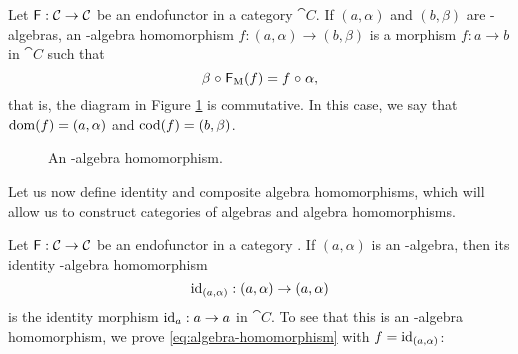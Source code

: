 \begin{definition}
  \label{def:algebra-homomorphism}


  Let $\mathsf{F}: \mathcal{C} \to \mathcal{C}$ be an endofunctor in a category
  $\cat{C}$. If $(a,\alpha)$ and $(b,\beta)$ are -algebras, an
  -algebra homomorphism $f: (a,\alpha) \to (b,\beta)$ is a
  morphism $f: a \to b$ in $\cat{C}$ such that
  \begin{equation}
    \label{eq:algebra-homomorphism}
    \beta \mathrel{\circ} \mathsf{F}_{\operatorname{M}}(f) = f \mathrel{\circ} \alpha
    \text{,}
  \end{equation}
  that is, the diagram in Figure \ref{fig:algebra-homomorphism} is
  commutative. In this case, we say that $\operatorname{dom}(f) = (a,\alpha)$ and
  $\operatorname{cod}(f) = (b,\beta)$.

  \begin{figure}[htb]
    \begin{center}
    \end{center}
    \caption{An -algebra homomorphism.}
    \label{fig:algebra-homomorphism}
  \end{figure}

\end{definition}

Let us now define identity and composite algebra homomorphisms, which
will allow us to construct categories of algebras and algebra
homomorphisms.

\begin{definition}
  \label{def:identity-algebra-homomorphism}

  Let $\mathsf{F}: \mathcal{C} \to \mathcal{C}$ be an endofunctor in a category
  . If $(a,\alpha)$ is an -algebra, then its identity
  -algebra homomorphism
  \begin{equation*}
    \operatorname{id}_{(a,\alpha)}: (a,\alpha) \to (a,\alpha)
  \end{equation*}
  is the identity morphism $\operatorname{id}_{a}: a \to a$ in $\cat{C}$. To see
  that this is an -al\-ge\-bra homomorphism, we prove
  \eqref{eq:algebra-homomorphism} with $f = \operatorname{id}_{(a,\alpha)}$:
  \begin{steps}
      \eqby{\eqref{eq:functor-identity}}
  \end{steps}

\end{definition}

